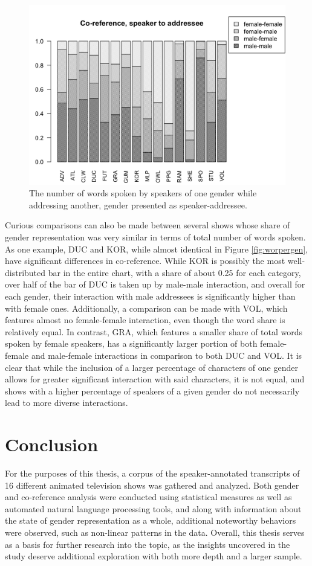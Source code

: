 \documentclass[a4paper, 11pt]{article}
\begin{document}
\begin{figure}[t!]
  \includegraphics[width=\linewidth]{figures/coreference.png}
  \caption{The number of words spoken by speakers of one gender while addressing another, gender presented as speaker-addressee.}
  \label{fig:coreference}
\end{figure}

Curious comparisons can also be made between several shows whose share of gender representation was very similar in terms of total number of words spoken. As one example, DUC and KOR, while almost identical in Figure \ref{fig:worpergen}, have significant differences in co-reference. While KOR is possibly the most well-distributed bar in the entire chart, with a share of about 0.25 for each category, over half of the bar of DUC is taken up by male-male interaction, and overall for each gender, their interaction with male addressees is significantly higher than with female ones. Additionally, a comparison can be made with VOL, which features almost no female-female interaction, even though the word share is relatively equal. In contrast, GRA, which features a smaller share of total words spoken by female speakers, has a significantly larger portion of both female-female and male-female interactions in comparison to both DUC and VOL. It is clear that while the inclusion of a larger percentage of characters of one gender allows for greater significant interaction with said characters, it is not equal, and shows with a higher percentage of speakers of a given gender do not necessarily lead to more diverse interactions.

\section{Conclusion}
For the purposes of this thesis, a corpus of the speaker-annotated transcripts of 16 different animated television shows was gathered and analyzed. Both gender and co-reference analysis were conducted using statistical measures as well as automated natural language processing tools, and along with information about the state of gender representation as a whole, additional noteworthy behaviors were observed, such as non-linear patterns in the data. Overall, this thesis serves as a basis for further research into the topic, as the insights uncovered in the study deserve additional exploration with both more depth and a larger sample.

\newpage


\end{document}
